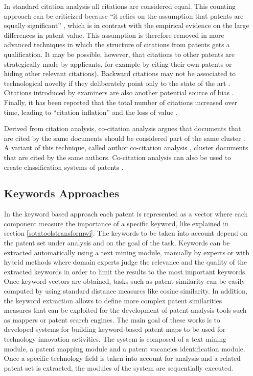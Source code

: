 \documentclass[]{book}
\theoremstyle{definition}
\theoremstyle{definition}
\theoremstyle{definition}
\theoremstyle{remark}
\begin{document}
In standard citation analysis all citations are considered equal. This
counting approach can be criticized because ``it relies on the
assumption that patents are equally significant'' \citep{gerken2012new},
which is in contrast with the empirical evidence on the large
differences in patent value. This assumption is therefore removed in
more advanced techniques in which the structure of citations from
patents gets a qualification. It may be possible, however, that
citations to other patents are strategically made by applicants, for
example by citing their own patents or hiding other relevant citations).
Backward citations may not be associated to technological novelty if
they deliberately point only to the state of the art
\citep{rost2011strength}. Citations introduced by examiners are also
another potential source of bias \citep{alcacer2006patent}. Finally, it
has been reported that the total number of citations increased over
time, leading to ``citation inflation'' and the loss of value
\citep{hall2001nber}.

Derived from citation analysis, co-citation analysis argues that
documents that are cited by the same documents should be considered part
of the same cluster \citep{small2006tracking, small1985clustering}. A
variant of this technique, called author co-citation analysis
\citep{white1981author}, cluster documents that are cited by the same
authors. Co-citation analysis can also be used to create classification
systems of patents \citep{lai2005using}.

\subsection{Keywords Approaches}\label{keywords-approaches}

In the keyword based approach each patent is represented as a vector
where each component measure the importance of a specific keyword, like
explained in section \ref{sotatoolstransformwi}. The keywords to be
taken into account depend on the patent set under analysis and on the
goal of the task. Keywords can be extracted automatically using a text
mining module, manually by experts or with hybrid methods where domain
experts judge the relevance and the quality of the extracted keywords in
order to limit the results to the most important keywords. Once keyword
vectors are obtained, tasks such as patent similarity can be easily
computed by using standard distance measures like cosine similarity. In
addition, the keyword extraction allows to define more complex patent
similarities measures \citep{moehrle2010measures} that can be exploited
for the development of patent analysis tools
\citep{lee2009approach, lee2015novelty} such as mappers or patent search
engines. The main goal of these works is to developed systems for
building keyword-based patent maps to be used for technology innovation
activities. The system is composed of a text mining module, a patent
mapping module and a patent vacancies identification module. Once a
specific technology field is taken into account for analysis and a
related patent set is extracted, the modules of the system are
sequentially executed.
\end{document}

